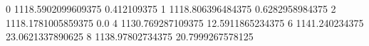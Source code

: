 0 1118.5902099609375 0.412109375
1 1118.806396484375 0.6282958984375
2 1118.1781005859375 0.0
4 1130.769287109375 12.5911865234375
6 1141.240234375 23.0621337890625
8 1138.97802734375 20.7999267578125

